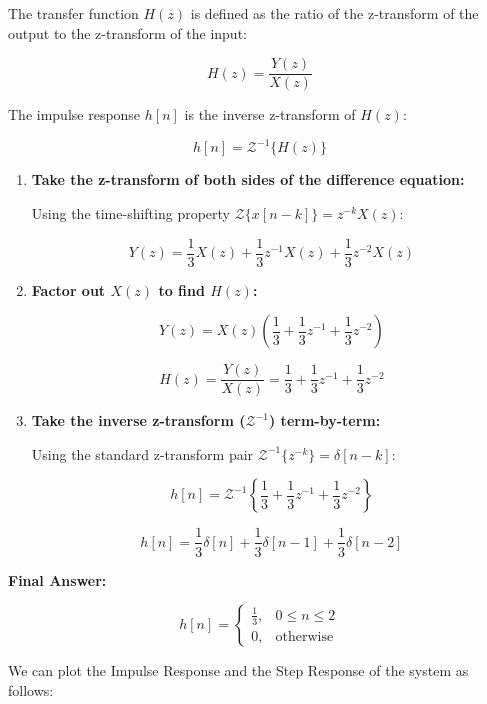 \begin{enumerate}
  The transfer function \(H(z)\) is defined as the ratio of the
  z-transform of the output to the z-transform of the input:

  \[H(z) = \frac{Y(z)}{X(z)}\]

  The impulse response \(h[n]\) is the inverse z-transform of \(H(z)\):

  \[h[n] = \mathcal{Z}^{-1}\{H(z)\}\]

  \begin{enumerate}
  \def\labelenumii{\arabic{enumii}.}
  \item
    \textbf{Take the z-transform of both sides of the difference
    equation:}

    Using the time-shifting property
    \(\mathcal{Z}\{x[n-k]\} = z^{-k}X(z)\):

    \[Y(z) = \frac{1}{3}X(z) + \frac{1}{3}z^{-1}X(z) + \frac{1}{3}z^{-2}X(z)\]
  \item
    \textbf{Factor out \(X(z)\) to find \(H(z)\):}

    \[Y(z) = X(z) \left( \frac{1}{3} + \frac{1}{3}z^{-1} + \frac{1}{3}z^{-2} \right)\]

    \[H(z) = \frac{Y(z)}{X(z)} = \frac{1}{3} + \frac{1}{3}z^{-1} + \frac{1}{3}z^{-2}\]
  \item
    \textbf{Take the inverse z-transform (\(\mathcal{Z}^{-1}\))
    term-by-term:}

    Using the standard z-transform pair
    \(\mathcal{Z}^{-1}\{z^{-k}\} = \delta[n-k]\):

    \[h[n] = \mathcal{Z}^{-1}\left\{ \frac{1}{3} + \frac{1}{3}z^{-1} + \frac{1}{3}z^{-2} \right\}\]

    \[h[n] = \frac{1}{3}\delta[n] + \frac{1}{3}\delta[n-1] + \frac{1}{3}\delta[n-2]\]
  \end{enumerate}

  \textbf{Final Answer:}

  \[h[n] = \begin{cases} \frac{1}{3}, & 0 \le n \le 2 \\ 0, & \text{otherwise} \end{cases}\]
\end{enumerate}

We can plot the Impulse Response and the Step Response of the system as
follows:

